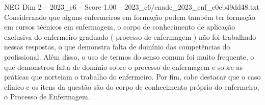 \begin{textsample}{NEG Dim 2 – 2023\_c6 – Score 1.00 – 2023\_c6/enade\_2023\_enf\_e0eb49dd48.txt}
Considerando que alguns enfermeiros em formação podem também ter formação em cursos técnicos em enfermagem, o corpo de conhecimento de aplicação exclusiva do enfermeiro graduado ( processo de enfermagem ) não foi trabalhado nessas respostas, o que demonstra falta de domínio das competências do profissional.
Além disso, o uso de termos do senso comum foi muito frequente, o que demonstrou falta de domínio sobre o processo de enfermagem e sobre as práticas que norteiam o trabalho do enfermeiro.
Por fim, cabe destacar que o caso clínico e os itens da questão são do corpo de conhecimento próprio do enfermeiro, o Processo de Enfermagem.

\end{textsample}
